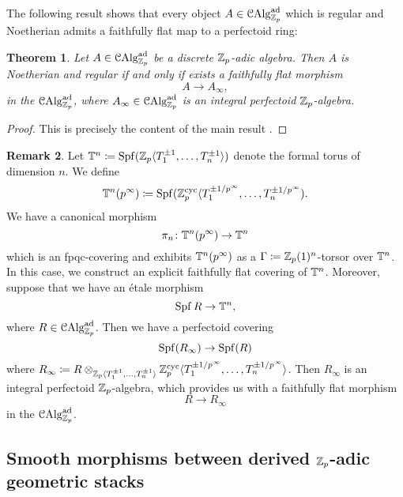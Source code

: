 \documentclass[10pt,a4paper]{amsart}
\numberwithin{equation}{subsection}
\newtheorem{theorem}{Theorem}[subsection]
\theoremstyle{definition}
\newtheorem{remark}[theorem]{Remark}
\begin{document}
The following result shows that every object $A \in \mathcal C \mathrm{Alg}^{\mathrm{ad}}_{\mathbb Z_p}$ which is regular and Noetherian admits a faithfully flat map to a perfectoid ring:

\begin{theorem}
    Let $A \in \mathcal C \mathrm{Alg}^{\mathrm{ad}}_{\mathbb Z_p}$ be a discrete $\mathbb Z_p$-adic algebra. Then $A$ is Noetherian and regular if and only if exists a faithfully flat morphism
        \[
                A \to A_\infty  ,
        \]
    in the \infcat $\mathcal C \mathrm{Alg}^{\mathrm{ad}}_{\mathbb Z_p}$, where $A_\infty \in \mathcal C \mathrm{Alg}^{\mathrm{ad}}_{\mathbb Z_p}$ is an integral perfectoid $\mathbb Z_p$-algebra.
\end{theorem}

\begin{proof}
    This is precisely the content of the main result \cite[Theorem 4.7]{bhatt2019regular}.
\end{proof}

\begin{remark}
    Let $\mathbb T^n \coloneqq \operatorname{Spf} (\mathbb Z_p \langle T_1^{\pm 1}, \dots , T_n^{\pm 1} \rangle)$ denote the formal torus of dimension $n$. We define
        \[
                \mathbb T^n(p^\infty) \coloneqq \operatorname{Spf} ( \mathbb Z_p^{\mathrm{cyc}} \langle T_1^{\pm 1/p^\infty}, \dots, T_n^{\pm 1/p^\infty})  .
        \]
    We have a canonical morphism
        \[
            \pi_n \colon \mathbb T^n(p^\infty) \to \mathbb T^n  
        \]
    which is an fpqc-covering and exhibits $\mathbb T^n(p^\infty)$ as a $\Gamma \coloneqq \mathbb Z_p(1)^n$-torsor over $\mathbb T^n$. 
    In this case, we construct an explicit faithfully flat covering of $\mathbb T^n$. Moreover, suppose that we have an \'etale morphism 
        \[
                \operatorname{Spf} R \to \mathbb T^n,
        \]
    where $ R \in \mathcal C \mathrm{Alg}^{\mathrm{ad}}_{\mathbb Z_p}$. Then we have a perfectoid covering
        \[
                \operatorname{Spf} (R_\infty) \to \operatorname{Spf}(R)  
        \]
    where $R_\infty \coloneqq R \otimes_{\mathbb Z_p \langle T_1^{\pm 1}, \dots , T_n^{\pm 1} \rangle} \mathbb Z_p^{\mathrm{cyc}} \langle T_1^{\pm 1/p^\infty}, \dots, T_n^{\pm 1/p^\infty} \rangle$.
    Then $R_\infty$ is an integral perfectoid $\mathbb Z_p$-algebra, which provides us with a faithfully flat morphism
        \[
                R \to R_\infty    
        \] 
    in the \infcat $\mathcal C \mathrm{Alg}^{\mathrm{ad}}_{\mathbb Z_p}$. 
\end{remark}

\subsection{Smooth morphisms between derived $\mathbb Z_p$-adic geometric stacks}
\end{document}
